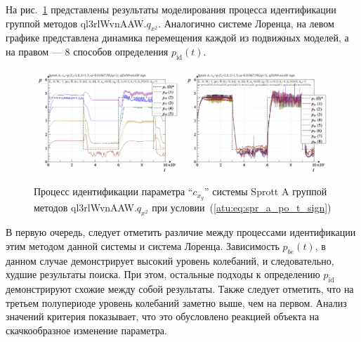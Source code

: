 На рис.~\ref{atu:f:spr_a_id_ql3rlWvnAAW_q_x2_sign} представлены результаты
моделирования процесса идентификации
группой методов ql3rlWvnAAW.$q_{x^2}$. Аналогично системе Лоренца, на левом графике представлена
динамика перемещения каждой из подвижных моделей,
а на правом --- 8 способов определения $p_\mathrm{id}(t)$.

\begin{figure}[htb!]
  \centerline{
    \includegraphics[width=0.49\textwidth]{p/cha/spr_a/ql3rlWvnAAW_x2/sprott_a_id-p_t_pi_ql3rlWvnAAW_sign.png}
    \hfill
    \includegraphics[width=0.49\textwidth]{p/cha/spr_a/ql3rlWvnAAW_x2/sprott_a_id-p_t_p_ql3rlWvnAAW_sign.png}
  }
  \caption{Процесс идентификации параметра ``$c_{x_y}$'' системы Sprott A группой методов ql3rlWvnAAW.$q_{x^2}$ при условии~(\ref{atu:eq:spr_a_po_t_sign})}
  \label{atu:f:spr_a_id_ql3rlWvnAAW_q_x2_sign}
\end{figure}

В первую очередь, следует отметить различие между процессами
идентификации этим методом данной системы и система Лоренца.
Зависимость $p_{be}(t)$, в данном случае демонстрирует
высокий уровень колебаний, и следовательно,
худшие результаты поиска. При этом,
остальные подходы к определению $p_\mathrm{id}$
демонстрируют схожие между собой результаты.
Также следует отметить, что на третьем полупериоде уровень колебаний заметно выше,
чем на первом. Анализ значений критерия показывает, что это обусловлено
реакцией объекта на скачкообразное изменение параметра.



